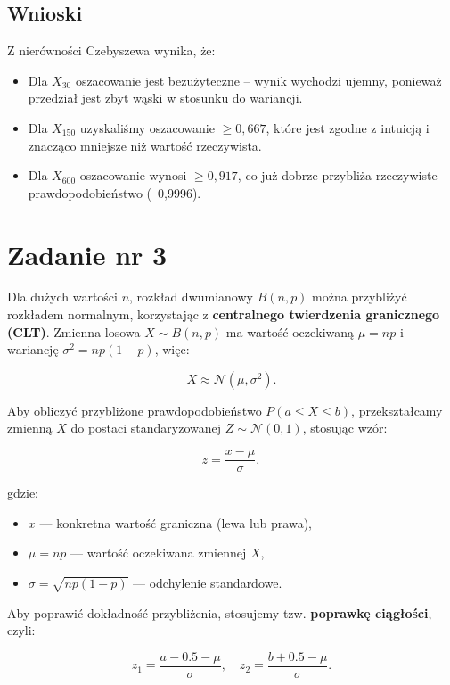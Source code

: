 \documentclass{article}
\begin{document}
\subsection*{Wnioski}

Z nierówności Czebyszewa wynika, że:
\begin{itemize}
    \item Dla \( X_{30} \) oszacowanie jest bezużyteczne – wynik wychodzi ujemny, ponieważ przedział jest zbyt wąski w stosunku do wariancji.
    \item Dla \( X_{150} \) uzyskaliśmy oszacowanie \( \geq 0{,}667 \), które jest zgodne z intuicją i znacząco mniejsze niż wartość rzeczywista.
    \item Dla \( X_{600} \) oszacowanie wynosi \( \geq 0{,}917 \), co już dobrze przybliża rzeczywiste prawdopodobieństwo (~0{,}9996).
\end{itemize}

\section{Zadanie nr 3}

Dla dużych wartości \( n \), rozkład dwumianowy \( B(n, p) \) można przybliżyć rozkładem normalnym, korzystając z \textbf{centralnego twierdzenia granicznego (CLT)}. Zmienna losowa \( X \sim B(n, p) \) ma wartość oczekiwaną \( \mu = np \) i wariancję \( \sigma^2 = np(1 - p) \), więc:

\[
X \approx \mathcal{N}(\mu, \sigma^2).
\]

Aby obliczyć przybliżone prawdopodobieństwo \( P(a \leq X \leq b) \), przekształcamy zmienną \( X \) do postaci standaryzowanej \( Z \sim \mathcal{N}(0,1) \), stosując wzór:

\[
z = \frac{x - \mu}{\sigma},
\]

gdzie:
\begin{itemize}
    \item \( x \) — konkretna wartość graniczna (lewa lub prawa),
    \item \( \mu = np \) — wartość oczekiwana zmiennej \( X \),
    \item \( \sigma = \sqrt{np(1 - p)} \) — odchylenie standardowe.
\end{itemize}

Aby poprawić dokładność przybliżenia, stosujemy tzw. \textbf{poprawkę ciągłości}, czyli:

\[
z_1 = \frac{a - 0.5 - \mu}{\sigma}, \quad z_2 = \frac{b + 0.5 - \mu}{\sigma}.
\]
\end{document}
